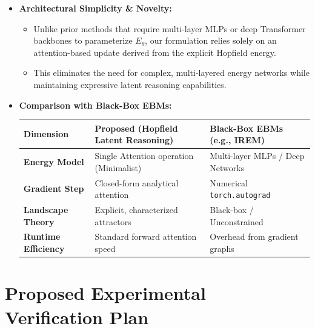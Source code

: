 \documentclass[11pt,a4paper]{article}
\begin{document}
\begin{itemize}[leftmargin=1.5em]
    \item \textbf{Architectural Simplicity \& Novelty:}
    \begin{itemize}[leftmargin=1.2em]
        \item Unlike prior methods that require multi-layer MLPs or deep Transformer backbones to parameterize $E_\theta$, our formulation relies solely on an attention-based update derived from the explicit Hopfield energy.
        \item This eliminates the need for complex, multi-layered energy networks while maintaining expressive latent reasoning capabilities.
    \end{itemize}

    \item \textbf{Comparison with Black-Box EBMs:}
    \begin{center}
    \small
    \begin{tabular}{@{}lll@{}}
    \toprule
    \textbf{Dimension} & \textbf{Proposed (Hopfield Latent Reasoning)} & \textbf{Black-Box EBMs (e.g., IREM)} \\
    \midrule
    \textbf{Energy Model} & Single Attention operation (Minimalist) & Multi-layer MLPs / Deep Networks \\
    \textbf{Gradient Step} & Closed-form analytical attention & Numerical \texttt{torch.autograd} \\
    \textbf{Landscape Theory} & Explicit, characterized attractors & Black-box / Unconstrained \\
    \textbf{Runtime Efficiency} & Standard forward attention speed & Overhead from gradient graphs \\
    \bottomrule
    \end{tabular}
    \end{center}
\end{itemize}

\section{Proposed Experimental Verification Plan}
\label{sec:experiments}
\end{document}

